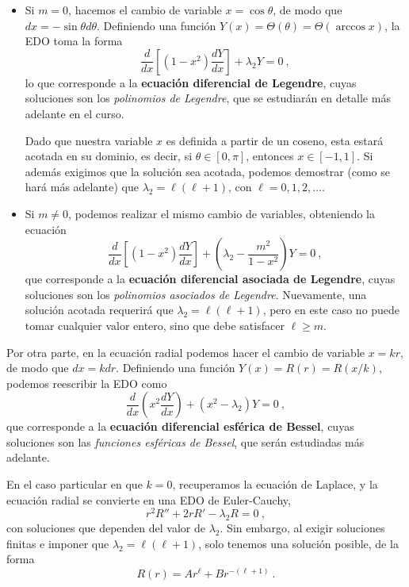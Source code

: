 \begin{itemize}
    \item Si $m=0$, hacemos el cambio de variable $x = \cos\theta$, de modo que $dx = -\sin \theta d\theta$. Definiendo una función $Y(x) = \Theta(\theta) = \Theta(\arccos x)$, la EDO toma la forma
    \begin{equation}
        \frac{d}{dx}\left[ (1-x^2) \frac{dY}{dx} \right] + \lambda_2 Y = 0 \ ,
    \end{equation}
    lo que corresponde a la \textbf{ecuación diferencial de Legendre}, cuyas soluciones son los \emph{polinomios de Legendre}, que se estudiarán en detalle más adelante en el curso. 
    
    Dado que nuestra variable $x$ es definida a partir de un coseno, esta estará acotada en su dominio, es decir, si $\theta \in [0, \pi]$, entonces $x \in [-1,1]$. Si además exigimos que la solución sea acotada, podemos demostrar (como se hará más adelante) que $\lambda_2 = \ell(\ell+1)$, con $\ell = 0, 1, 2, \dots$.

    \item Si $m \neq 0$, podemos realizar el mismo cambio de variables, obteniendo la ecuación
    \begin{equation}
        \frac{d}{dx}\left[ (1-x^2) \frac{dY}{dx} \right] +  \left( \lambda_2 - \frac{m^2}{1-x^2} \right)Y = 0 \ ,
    \end{equation}
    que corresponde a la \textbf{ecuación diferencial asociada de Legendre}, cuyas soluciones son los \emph{polinomios asociados de Legendre}. Nuevamente, una solución acotada requerirá que $\lambda_2 = \ell(\ell+1)$, pero en este caso no puede tomar cualquier valor entero, sino que debe satisfacer $\ell \geq m$.
\end{itemize}

Por otra parte, en la ecuación radial podemos hacer el cambio de variable $x = kr$, de modo que $dx = k dr$. Definiendo una función $Y(x) = R(r) = R(x/k)$, podemos reescribir la EDO como
\begin{equation}
    \frac{d}{dx}\left( x^2 \frac{dY}{dx} \right) + (x^2 - \lambda_2)Y = 0 \ ,
\end{equation}
que corresponde a la \textbf{ecuación diferencial esférica de Bessel}, cuyas soluciones son las \emph{funciones esféricas de Bessel}, que serán estudiadas más adelante.

En el caso particular en que $k=0$, recuperamos la ecuación de Laplace, y la ecuación radial se convierte en una EDO de Euler-Cauchy,
\begin{equation}
    r^2 R'' + 2r R' - \lambda_2 R = 0 \ ,
\end{equation}
con soluciones que dependen del valor de $\lambda_2$. Sin embargo, al exigir soluciones finitas e imponer que $\lambda_2 = \ell(\ell+1)$, solo tenemos una solución posible, de la forma
\begin{equation}
    R(r) = A r^\ell + B r^{-(\ell+1)} \ .
\end{equation}


